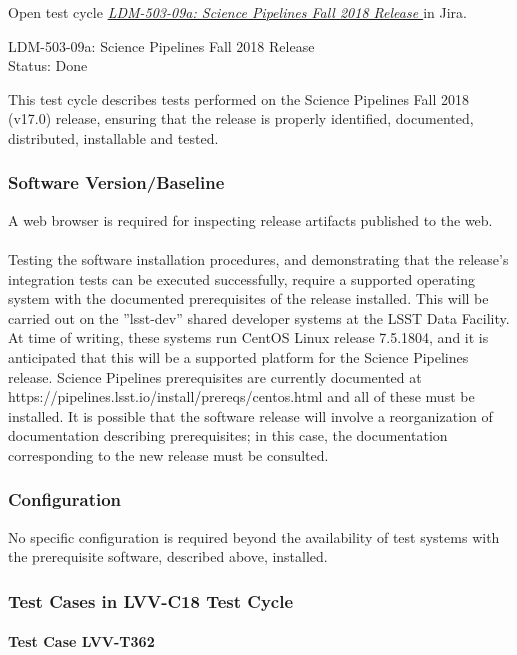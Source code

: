 \documentclass[DM,lsstdraft,STR,toc]{lsstdoc}
\begin{document}
Open test cycle {\it \href{https://jira.lsstcorp.org/secure/Tests.jspa#/testrun/LVV-C18}{LDM-503-09a: Science Pipelines Fall 2018 Release
}} in Jira.

  LDM-503-09a: Science Pipelines Fall 2018 Release
\\
  Status: Done

  This test cycle describes tests performed on the Science Pipelines Fall
2018 (v17.0) release, ensuring that the release is properly identified,
documented, distributed, installable and tested.


  \subsubsection{Software Version/Baseline}
    A web browser is required for inspecting release artifacts published to
the web.\\
~\\
Testing the software installation procedures, and demonstrating that the
release's integration tests can be executed successfully, require a
supported operating system with the documented prerequisites of the
release installed. This will be carried out on the ''lsst-dev'' shared
developer systems at the LSST Data Facility. At time of writing, these
systems run CentOS Linux release 7.5.1804, and it is anticipated that
this will be a supported platform for the Science Pipelines release.
Science Pipelines prerequisites are currently documented at
https://pipelines.lsst.io/install/prereqs/centos.html and all of these
must be installed. It is possible that the software release will involve
a reorganization of documentation describing prerequisites; in this
case, the documentation corresponding to the new release must be
consulted.


  \subsubsection{Configuration}
    No specific configuration is required beyond the availability of test
systems with the prerequisite software, described above, installed.


  \subsubsection{Test Cases in LVV-C18 Test Cycle}


    \paragraph{Test Case LVV-T362 }\mbox{}\\
\end{document}
